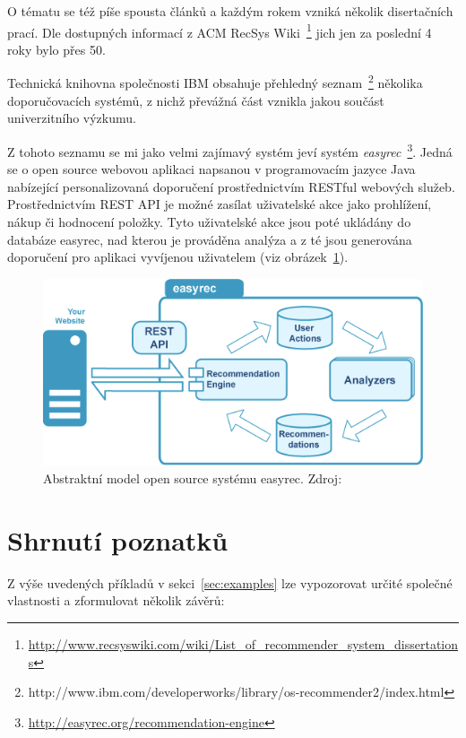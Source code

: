 \documentclass[thesis=M,czech]{FITthesis}[2014/05/07]
\begin{document}
O tématu se též píše spousta článků a každým rokem vzniká několik disertačních prací. Dle dostupných informací z ACM RecSys Wiki~\footnote{\url{http://www.recsyswiki.com/wiki/List_of_recommender_system_dissertations}} jich jen za poslední 4 roky bylo přes 50. 

Technická knihovna společnosti IBM obsahuje přehledný seznam~\footnote{http://www.ibm.com/developerworks/library/os-recommender2/index.html} několika doporučovacích systémů, z nichž převážná část vznikla jakou součást univerzitního výzkumu.

Z tohoto seznamu se mi jako velmi zajímavý systém jeví systém \emph{easyrec}~\footnote{\url{http://easyrec.org/recommendation-engine}}. Jedná se o open source webovou aplikaci napsanou v programovacím jazyce Java nabízející personalizovaná doporučení prostřednictvím RESTful webových služeb. Prostřednictvím REST API je možné zasílat uživatelské akce jako prohlížení, nákup či hodnocení položky. Tyto uživatelské akce jsou poté ukládány do databáze easyrec, nad kterou je prováděna analýza a z té jsou generována doporučení pro aplikaci vyvíjenou uživatelem (viz obrázek~\ref{fig:easyrec}).

\begin{figure}\centering
	\includegraphics[width=1.0\textwidth]{obr/easyrec.png}
 	\caption[Abstraktní model open source systému easyrec]{Abstraktní model open source systému easyrec. Zdroj: \cite{easyrec}}\label{fig:easyrec}
\end{figure}	

\section{Shrnutí poznatků}

Z výše uvedených příkladů v sekci~\ref{sec:examples} lze vypozorovat určité společné vlastnosti a zformulovat několik závěrů:
\end{document}
